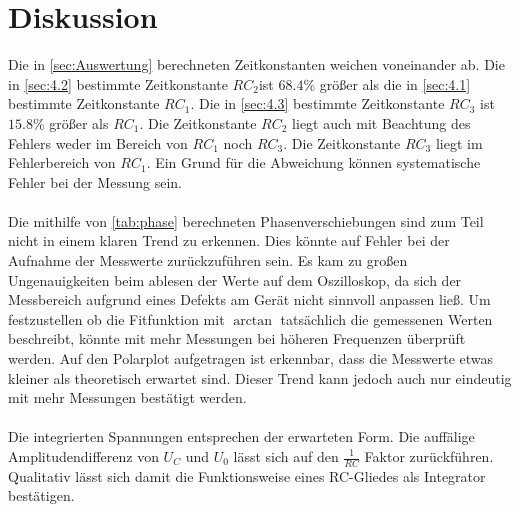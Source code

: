 \section{Diskussion}
\label{sec:Diskussion}
Die in \autoref{sec:Auswertung} berechneten Zeitkonstanten weichen voneinander ab. Die in \autoref{sec:4.2} bestimmte Zeitkonstante $RC_2$ist 
$68.4\%$ größer als die in \autoref{sec:4.1} bestimmte Zeitkonstante $RC_1$. Die in \autoref{sec:4.3} bestimmte Zeitkonstante $RC_3$ ist $15.8\%$ größer als $RC_1$.
Die Zeitkonstante $RC_2$ liegt auch mit Beachtung des Fehlers weder im Bereich von $RC_1$ noch $RC_3$. 
Die Zeitkonstante $RC_3$ liegt im Fehlerbereich von $RC_1$.
Ein Grund für die Abweichung können systematische Fehler bei der Messung sein.%
\\
\\
Die mithilfe von \autoref{tab:phase} berechneten Phasenverschiebungen sind zum Teil nicht in einem klaren Trend zu erkennen.
Dies könnte auf Fehler bei der Aufnahme der Messwerte zurückzuführen sein. Es kam zu großen Ungenauigkeiten beim ablesen 
der Werte auf dem Oszilloskop, da sich der Messbereich aufgrund eines Defekts am Gerät nicht sinnvoll anpassen ließ. 
Um festzustellen ob die Fitfunktion mit $\arctan$ tatsächlich die gemessenen Werten beschreibt, könnte mit mehr Messungen bei höheren Frequenzen überprüft werden. 
Auf den Polarplot aufgetragen ist erkennbar, dass die Messwerte etwas kleiner als theoretisch erwartet sind. Dieser Trend kann jedoch auch nur eindeutig mit mehr Messungen bestätigt werden.
\\
\\
Die integrierten Spannungen entsprechen der erwarteten Form.
Die auffälige Amplitudendifferenz von $U_C$ und $U_0$ lässt sich auf den $\frac{1}{RC}$ Faktor zurückführen.
Qualitativ lässt sich damit die Funktionsweise eines RC-Gliedes als Integrator bestätigen. 
\newpage